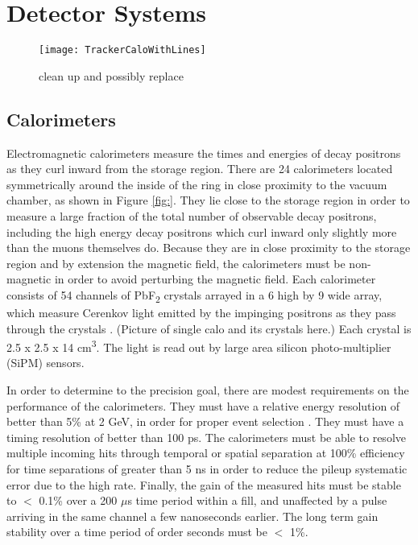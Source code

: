 \section{Detector Systems}
\label{sec:DetectorSystems}

\begin{figure}[]
    \label{fig:TrackerCaloWithLines}
    \centering
    \texttt{[image: TrackerCaloWithLines]}
    \caption[TrackerCaloWithLines]{clean up and possibly replace}   
\end{figure}


\subsection{Calorimeters}
\label{sec:Calorimeters}



Electromagnetic calorimeters measure the times and energies of decay positrons as they curl inward from the storage region. There are 24 calorimeters located symmetrically around the inside of the ring in close proximity to the vacuum chamber, as shown in Figure \ref{fig:}. They lie close to the storage region in order to measure a large fraction of the total number of observable decay positrons, including the high energy decay positrons which curl inward only slightly more than the muons themselves do. Because they are in close proximity to the storage region and by extension the magnetic field, the calorimeters must be non-magnetic in order to avoid perturbing the magnetic field. Each calorimeter consists of 54 channels of PbF\textsubscript{2} crystals arrayed in a 6 high by 9 wide array, which measure Cerenkov light emitted by the impinging positrons as they pass through the crystals \cite{Fienberg:2014kka}. (Picture of single calo and its crystals here.) Each crystal is 2.5 x 2.5 x 14 cm\textsuperscript{3}. The light is read out by large area silicon photo-multiplier (SiPM) sensors.


In order to determine \amu to the precision goal, there are modest requirements on the performance of the calorimeters. They must have a relative energy resolution of better than 5\% at 2 GeV, in order for proper event selection \cite{TDR}. They must have a timing resolution of better than 100 ps. The calorimeters must be able to resolve multiple incoming hits through temporal or spatial separation at 100\% efficiency for time separations of greater than 5 ns in order to reduce the pileup systematic error due to the high rate. Finally, the gain of the measured hits must be stable to $<$ 0.1\% over a 200 $\mu$s time period within a fill, and unaffected by a pulse arriving in the same channel a few nanoseconds earlier. The long term gain stability over a time period of order seconds must be $<$ 1\%.

